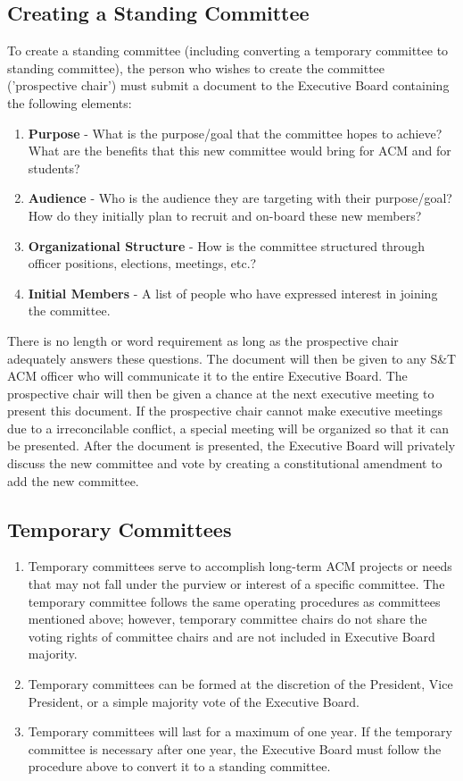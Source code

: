 \subsection{Creating a Standing Committee}
To create a standing committee (including converting a temporary committee to
standing committee), the person who wishes to create the committee ('prospective
chair') must submit a document to the Executive Board containing the following
elements:
\begin{enumerate}[label=\arabic*., nolistsep]
  \item \textbf{Purpose} - What is the purpose/goal that the committee hopes to
    achieve? What are the benefits that this new committee would bring for ACM
    and for students?
  \item \textbf{Audience} - Who is the audience they are targeting with their
    purpose/goal? How do they initially plan to recruit and on-board these new
    members?
  \item \textbf{Organizational Structure} - How is the committee structured
    through officer positions, elections, meetings, etc.?
  \item \textbf{Initial Members} - A list of people who have expressed interest
    in joining the committee.
\end{enumerate}

There is no length or word requirement as long as the prospective chair
adequately answers these questions. The document will then be given to any S\&T
ACM officer who will communicate it to the entire Executive Board. The
prospective chair will then be given a chance at the next executive meeting to
present this document. If the prospective chair cannot make executive meetings
due to a irreconcilable conflict, a special meeting will be organized so that it
can be presented. After the document is presented, the Executive Board will
privately discuss the new committee and vote by creating a constitutional
amendment to add the new committee.

\subsection{Temporary Committees}
\begin{enumerate}
  \item Temporary committees serve to accomplish long-term ACM projects or
    needs that may not fall under the purview or interest of a specific
    committee. The temporary committee follows the same operating procedures
    as committees mentioned above; however, temporary committee chairs do
    not share the voting rights of committee chairs and are not included in
    Executive Board majority.
  \item Temporary committees can be formed at the discretion of the
    President, Vice President, or a simple majority vote of the Executive
    Board.
  \item Temporary committees will last for a maximum of one year. If the
    temporary committee is necessary after one year, the Executive Board must
    follow the procedure above to convert it to a standing committee.
\end{enumerate}
